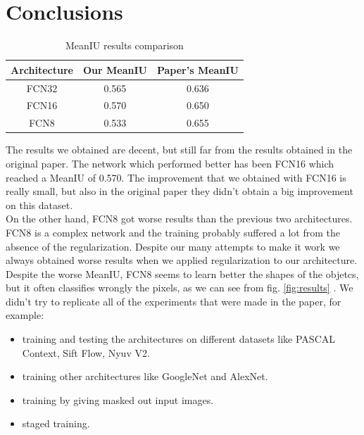 \documentclass[10pt,twocolumn,letterpaper]{article}
\begin{document}
\section{Conclusions}
\begin{table}[htp]
	\begin{center}
		\begin{tabular}{|c|c|c|}
			\hline
			Architecture & Our MeanIU & Paper's MeanIU\\
			\hline\hline
			FCN32 & 0.565 & 0.636\\
			FCN16 & 0.570 & 0.650\\
			FCN8 & 0.533 & 0.655\\
			\hline
		\end{tabular}
	\end{center}
	\caption{MeanIU results comparison}
	\label{mytable}
\end{table}
The results we obtained are decent, but still far from the results obtained in the original paper. The network which performed better has been FCN16 which reached a MeanIU of 0.570. The improvement that we obtained with FCN16 is really small, but also in the original paper they didn't obtain a big improvement on this dataset. \\
On the other hand, FCN8 got worse results than the previous two architectures. FCN8 is a complex network and the training probably suffered a lot from the absence of the regularization. Despite our many attempts to make it work we always obtained worse results when we applied regularization to our architecture. \\
Despite the worse MeanIU, FCN8 seems to learn better the shapes of the objetcs, but it often classifies wrongly the pixels, as we can see from fig. \ref{fig:results} .
We didn't try to replicate all of the experiments that were made in the paper, for example:
\begin{itemize}
	\item training and testing the architectures on different datasets like PASCAL Context, Sift Flow, Nyuv V2.
	\item training other architectures like GoogleNet and AlexNet.
	\item training by giving masked out input images.
	\item staged training.
\end{itemize}


{\small


}
\end{document}
